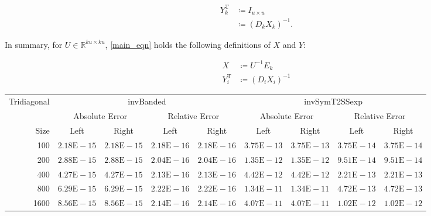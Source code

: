 \documentclass[11pt]{article}
\newcommand{\T}{\mathrm{T}}
\begin{document}
\begin{align*}
    Y_{k}^{\T} &\coloneqq I_{u \times u} \\
        &\coloneqq (D_{k} X_{k})^{-1}.
\end{align*}

\noindent In summary, for $U \in \mathbb{R}^{ku \times ku}$, \eqref{main_eqn} holds the following definitions of $X$ and $Y$:

\begin{align*}
    X &\coloneqq U^{-1} E_{k} \\
    Y_{i}^{\T} &\coloneqq (D_{i} X_{i})^{-1}
\end{align*}





\newpage


\begin{tabular}{|r|c|c|c|c|c|c|r|r|}
    \hline \multirow{2}{*}{ Tridiagonal } & \multicolumn{4}{|c|}{ invBanded } & \multicolumn{4}{|c|}{ invSymT2SSexp } \\
    \cline { 2 - 8 } & \multicolumn{2}{|c|}{ Absolute Error } & \multicolumn{2}{|c|}{ Relative Error } & \multicolumn{2}{|c|}{ Absolute Error } & \multicolumn{2}{|c|}{ Relative Error } \\
    \hline Size & \multicolumn{1}{|c|}{ Left } & \multicolumn{1}{|c|}{ Right } & \multicolumn{1}{c|}{ Left } & \multicolumn{1}{c|}{ Right } & \multicolumn{1}{c|}{ Left } & \multicolumn{1}{c|}{ Right } & \multicolumn{1}{|c|}{ Left } & \multicolumn{1}{|c|}{ Right } \\
    \hline 100 & $2.18 \mathrm{E}-15$ & $2.18 \mathrm{E}-15$ & $2.18 \mathrm{E}-16$ & $2.18 \mathrm{E}-16$ & $3.75 \mathrm{E}-13$ & $3.75 \mathrm{E}-13$ & $3.75 \mathrm{E}-14$ & $3.75 \mathrm{E}-14$ \\
    \hline 200 & $2.88 \mathrm{E}-15$ & $2.88 \mathrm{E}-15$ & $2.04 \mathrm{E}-16$ & $2.04 \mathrm{E}-16$ & $1.35 \mathrm{E}-12$ & $1.35 \mathrm{E}-12$ & $9.51 \mathrm{E}-14$ & $9.51 \mathrm{E}-14$ \\
    \hline 400 & $4.27 \mathrm{E}-15$ & $4.27 \mathrm{E}-15$ & $2.13 \mathrm{E}-16$ & $2.13 \mathrm{E}-16$ & $4.42 \mathrm{E}-12$ & $4.42 \mathrm{E}-12$ & $2.21 \mathrm{E}-13$ & $2.21 \mathrm{E}-13$ \\
    \hline 800 & $6.29 \mathrm{E}-15$ & $6.29 \mathrm{E}-15$ & $2.22 \mathrm{E}-16$ & $2.22 \mathrm{E}-16$ & $1.34 \mathrm{E}-11$ & $1.34 \mathrm{E}-11$ & $4.72 \mathrm{E}-13$ & $4.72 \mathrm{E}-13$ \\
    \hline 1600 & $8.56 \mathrm{E}-15$ & $8.56 \mathrm{E}-15$ & $2.14 \mathrm{E}-16$ & $2.14 \mathrm{E}-16$ & $4.07 \mathrm{E}-11$ & $4.07 \mathrm{E}-11$ & $1.02 \mathrm{E}-12$ & $1.02 \mathrm{E}-12$ \\

\end{tabular}
\end{document}
